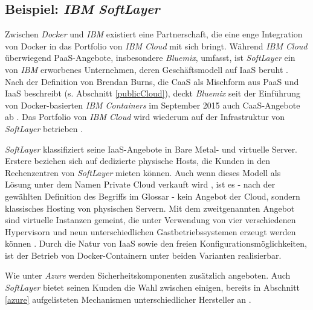 \documentclass[../main.tex]{subfiles}
\begin{document}
    \subsection{Beispiel: \emph{IBM} \emph{SoftLayer}}
    \label{softlayer}
      Zwischen \emph{Docker} und \emph{IBM} existiert eine Partnerschaft, die eine enge Integration von Docker in das Portfolio von \emph{IBM Cloud} mit sich bringt. Während \emph{IBM Cloud} überwiegend PaaS-Angebote, insbesondere \emph{Bluemix}, umfasst, ist \emph{SoftLayer} ein von \emph{IBM} erworbenes Unternehmen, deren Geschäftsmodell auf IaaS beruht \cite{IBMDockerServices}. Nach der Definition von Brendan Burns, die CaaS als Mischform aus PaaS und IaaS beschreibt (s. Abschnitt \ref{publicCloud}), deckt \emph{Bluemix} seit der Einführung von Docker-basierten \emph{IBM Containers} im September 2015 auch CaaS-Angebote ab \cite{IBMContainerLaunch}. Das Portfolio von \emph{IBM Cloud} wird wiederum auf der Infrastruktur von \emph{SoftLayer} betrieben \cite{IBMPartnershipDocker}.

      \emph{SoftLayer} klassifiziert seine IaaS-Angebote in Bare Metal- und virtuelle Server. Erstere beziehen sich auf dedizierte physische Hosts, die Kunden in den Rechenzentren von \emph{SoftLayer} mieten können. Auch wenn dieses Modell als Lösung unter dem Namen Private Cloud verkauft wird \cite{softlayerPrivateCloud}, ist es - nach der gewählten Definition des Begriffs im Glossar - kein Angebot der Cloud, sondern klassisches Hosting von physischen Servern.
      Mit dem zweitgenannten Angebot sind virtuelle Instanzen gemeint, die unter Verwendung von vier verschiedenen Hypervisorn und neun unterschiedlichen Gastbetriebssystemen erzeugt werden können \cite{softlayerSoftware}. Durch die Natur von IaaS sowie den freien Konfigurationsmöglichkeiten, ist der Betrieb von Docker-Containern unter beiden Varianten realisierbar.

      Wie unter \emph{Azure} werden Sicherheitskomponenten zusätzlich angeboten. Auch \emph{SoftLayer} bietet seinen Kunden die Wahl zwischen einigen, bereits in Abschnitt \ref{azure} aufgelisteten Mechanismen unterschiedlicher Hersteller an \cite{softlayerSoftwareSec}.
\end{document}
